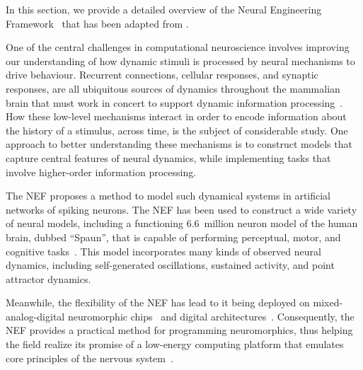 In this section, we provide a detailed overview of the Neural Engineering Framework~\citep[NEF;][]{eliasmith2003a} that has been adapted from \citet{voelker2018}.

One of the central challenges in computational neuroscience involves improving our understanding of how dynamic stimuli is processed by neural mechanisms to drive behaviour.
Recurrent connections, cellular responses, and synaptic responses, are all ubiquitous sources of dynamics throughout the mammalian brain that must work in concert to support dynamic information processing~\citep{kandel2000principles}.
How these low-level mechanisms interact in order to encode information about the history of a stimulus, across time, is the subject of considerable study.
One approach to better understanding these mechanisms is to construct models that capture central features of neural dynamics, while implementing tasks that involve higher-order information processing.


The NEF proposes a method to model such dynamical systems in artificial networks of spiking neurons.
The NEF has been used to construct a wide variety of neural models, including a functioning 6.6~million neuron model of the human brain, dubbed ``Spaun'', that is capable of performing perceptual, motor, and cognitive tasks~\citep{eliasmith2012, choo2018}.
This model incorporates many kinds of observed neural dynamics, including self-generated oscillations, sustained activity, and point attractor dynamics.

Meanwhile, the flexibility of the NEF has lead to it being deployed on mixed-analog-digital neuromorphic chips~\citep{choudhary2012silicon, corradi2014, voelker2017iscas, voelker2017neuromorphic, braindrop2019} and digital architectures~\citep{bekolay2013, wang2014compact, mundy2015, knight2016, berzish2016, wang2017neuromorphic, blouw2018a}.
Consequently, the NEF provides a practical method for programming neuromorphics, thus helping the field realize its promise of a low-energy computing platform that emulates core principles of the nervous system~\citep{boahen2017neuromorph}.

